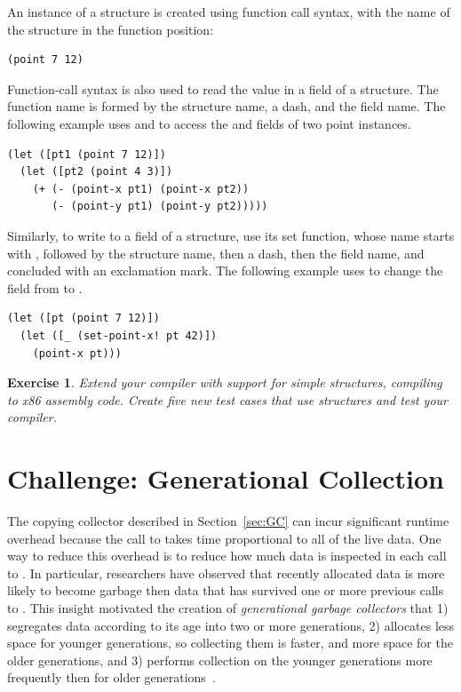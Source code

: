 \documentclass[11pt]{book}
\newtheorem{exercise}[theorem]{Exercise}
\begin{document}
An instance of a structure is created using function call syntax, with
the name of the structure in the function position:
\begin{lstlisting}
(point 7 12)
\end{lstlisting}
Function-call syntax is also used to read the value in a field of a
structure. The function name is formed by the structure name, a dash,
and the field name. The following example uses  and
 to access the  and  fields of two point
instances.
\begin{center}
\begin{lstlisting}
(let ([pt1 (point 7 12)])
  (let ([pt2 (point 4 3)])
    (+ (- (point-x pt1) (point-x pt2))
       (- (point-y pt1) (point-y pt2)))))
\end{lstlisting}
\end{center}
Similarly, to write to a field of a structure, use its set function,
whose name starts with , followed by the structure name,
then a dash, then the field name, and concluded with an exclamation
mark. The following example uses  to change the
 field from  to .
\begin{center}
  \begin{lstlisting}
(let ([pt (point 7 12)])
  (let ([_ (set-point-x! pt 42)])
    (point-x pt)))
\end{lstlisting}
\end{center}

\begin{exercise}\normalfont
  Extend your compiler with support for simple structures, compiling
  \LangStruct{} to x86 assembly code. Create five new test cases that use
  structures and test your compiler.
\end{exercise}


\section{Challenge: Generational Collection}

The copying collector described in Section~\ref{sec:GC} can incur
significant runtime overhead because the call to  takes
time proportional to all of the live data. One way to reduce this
overhead is to reduce how much data is inspected in each call to
. In particular, researchers have observed that recently
allocated data is more likely to become garbage then data that has
survived one or more previous calls to . This insight
motivated the creation of \emph{generational garbage collectors}
 that
1) segregates data according to its age into two or more generations,
2) allocates less space for younger generations, so collecting them is
faster, and more space for the older generations, and 3) performs
collection on the younger generations more frequently then for older
generations~\citep{Wilson:1992fk}.
\end{document}
